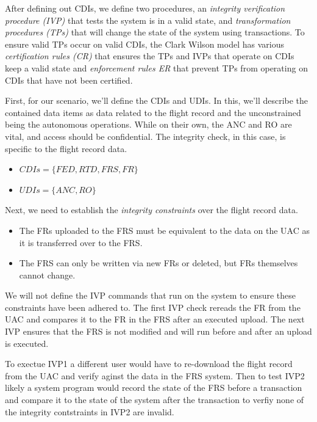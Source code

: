 \documentclass[10pt,journal,compsoc]{IEEEtran}
\begin{document}
After defining out CDIs, we define two procedures, an \textit{integrity verification procedure (IVP)} that tests the system is in a valid state, and \textit{transformation procedures (TPs)} that will change the state of the system using transactions. To ensure valid TPs occur on valid CDIs, the Clark Wilson model has various \textit{certification rules (CR)} that ensures the TPs and IVPs that operate on CDIs keep a valid state and \textit{enforcement rules {ER}} that prevent TPs from operating on CDIs that have not been certified.

First, for our scenario, we'll define the CDIs and UDIs. In this, we'll describe the contained data items as data related to the flight record and the unconstrained being the autonomous operations. While on their own, the ANC and RO are vital, and access should be confidential. The integrity check, in this case, is specific to the flight record data. 

\begin{itemize}
  \item $CDIs=\{FED, RTD, FRS, FR\}$
  \item $UDIs=\{ANC, RO\}$
\end{itemize}

Next, we need to establish the \textit{integrity constraints} over the flight record data. 

\begin{itemize}
  \item The FRs uploaded to the FRS must be equivalent to the data on the UAC as it is transferred over to the FRS.
  \item The FRS can only be written via new FRs or deleted, but FRs themselves cannot change.
\end{itemize}

We will not define the IVP commands that run on the system to ensure these constraints have been adhered to. 
The first IVP check rereads the FR from the UAC and compares it to the FR in the FRS after an executed upload.
The next IVP ensures that the FRS is not modified and will run before and after an upload is executed.

To exectue IVP1 a different user would have to re-download the flight record from the UAC and verify aginst the data in the FRS system. 
Then to test IVP2 likely a system program would record the state of the FRS before a transaction and compare it to the state of the system after the transaction to verfiy none of the integrity contstraints in IVP2 are invalid. 
\end{document}
